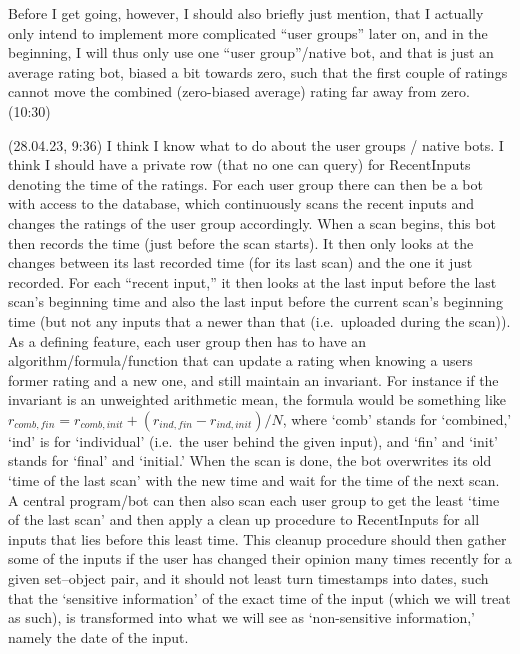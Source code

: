 \documentclass{report}
\begin{document}
Before I get going, however, I should also briefly just mention, that I actually only intend to implement more complicated ``user groups'' later on, and in the beginning, I will thus only use one ``user group''/native bot, and that is just an average rating bot, biased a bit towards zero, such that the first couple of ratings cannot move the combined (zero-biased average) rating far away from zero. (10:30)

(28.04.23, 9:36) I think I know what to do about the user groups / native bots. I think I should have a private row (that no one can query) for RecentInputs denoting the time of the ratings. For each user group there can then be a bot with access to the database, which continuously scans the recent inputs and changes the ratings of the user group accordingly. When a scan begins, this bot then records the time (just before the scan starts). It then only looks at the changes between its last recorded time (for its last scan) and the one it just recorded. For each ``recent input,'' it then looks at the last input before the last scan's beginning time and also the last input before the current scan's beginning time (but not any inputs that a newer than that (i.e.\ uploaded during the scan)). As a defining feature, each user group then has to have an algorithm/formula/function that can update a rating when knowing a users former rating and a new one, and still maintain an invariant. For instance if the invariant is an unweighted arithmetic mean, the formula would be something like
$r_{comb, fin} = r_{comb, init} + (r_{ind, fin} - r_{ind, init})/N$, where `comb' stands for `combined,' `ind' is for `individual' (i.e.\ the user behind the given input), and `fin' and `init' stands for `final' and `initial.' When the scan is done, the bot overwrites its old `time of the last scan' with the new time and wait for the time of the next scan. A central program/bot can then also scan each user group to get the least `time of the last scan' and then apply a clean up procedure to RecentInputs for all inputs that lies before this least time. This cleanup procedure should then gather some of the inputs if the user has changed their opinion many times recently for a given set--object pair, and it should not least turn timestamps into dates, such that the `sensitive information' of the exact time of the input (which we will treat as such), is transformed into what we will see as `non-sensitive information,' namely the date of the input.
\end{document}
